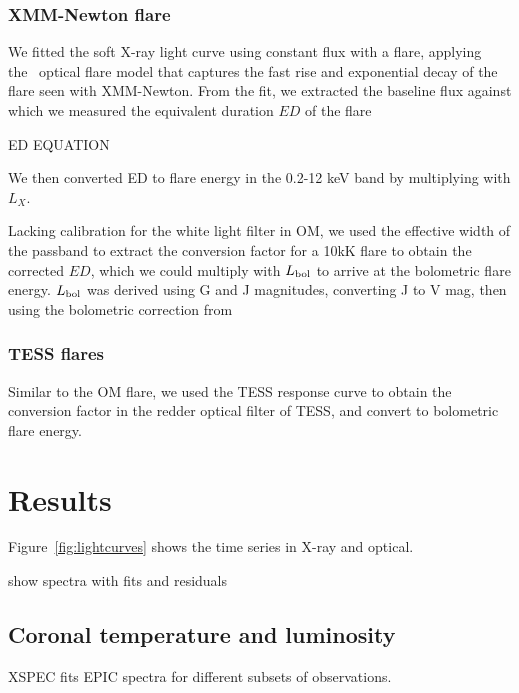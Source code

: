 \documentclass[twocolumn]{aastex631}
\begin{document}
\subsubsection{XMM-Newton flare}

We fitted the soft X-ray light curve using constant flux with a flare, applying the~\citet{davenport2014kepler} optical flare model that captures the fast rise and exponential decay of the flare seen with XMM-Newton. From the fit, we extracted the baseline flux against which we measured the equivalent duration $ED$ of the flare

ED EQUATION

We then converted ED to flare energy in the 0.2-12 keV band by multiplying with $L_X$. 

Lacking calibration for the white light filter in OM, we used the effective width of the passband to extract the conversion factor for a 10kK flare to obtain the corrected $ED$, which we could multiply with $L_{\rm bol}$ to arrive at the bolometric flare energy. $L_{\rm bol}$ was derived using G and J magnitudes, converting J to V mag, then using the bolometric correction from
\subsubsection{TESS flares}

Similar to the OM flare, we used the TESS response curve to obtain the conversion factor in the redder optical filter of TESS, and convert to bolometric flare energy.


\section{Results}

Figure~\ref{fig:lightcurves} shows the time series in X-ray and optical. 



show spectra with fits and residuals


\subsection{Coronal temperature and luminosity}


\begin{table}
\centering
    \caption{XSPEC fits EPIC spectra for different subsets of observations.}
    
        \label{tab:specfit}
\end{table}
\end{document}
